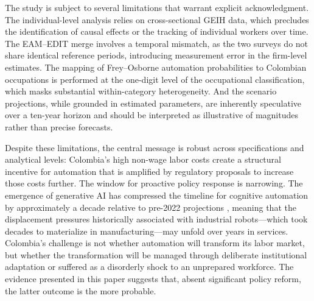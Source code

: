 The study is subject to several limitations that warrant explicit acknowledgment. The individual-level analysis relies on cross-sectional GEIH data, which precludes the identification of causal effects or the tracking of individual workers over time. The EAM--EDIT merge involves a temporal mismatch, as the two surveys do not share identical reference periods, introducing measurement error in the firm-level estimates. The mapping of Frey--Osborne automation probabilities to Colombian occupations is performed at the one-digit level of the occupational classification, which masks substantial within-category heterogeneity. And the scenario projections, while grounded in estimated parameters, are inherently speculative over a ten-year horizon and should be interpreted as illustrative of magnitudes rather than precise forecasts.

Despite these limitations, the central message is robust across specifications and analytical levels: Colombia's high non-wage labor costs create a structural incentive for automation that is amplified by regulatory proposals to increase those costs further. The window for proactive policy response is narrowing. The emergence of generative AI has compressed the timeline for cognitive automation by approximately a decade relative to pre-2022 projections \cite{wef2025}, meaning that the displacement pressures historically associated with industrial robots---which took decades to materialize in manufacturing---may unfold over years in services. Colombia's challenge is not whether automation will transform its labor market, but whether the transformation will be managed through deliberate institutional adaptation or suffered as a disorderly shock to an unprepared workforce. The evidence presented in this paper suggests that, absent significant policy reform, the latter outcome is the more probable.